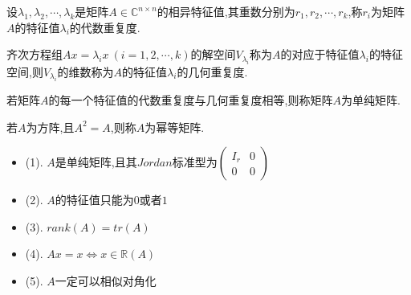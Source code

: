\begin{definition}[代数重复度]
	设$\lambda_{1},\lambda_{2},\cdots,\lambda_{k}$是矩阵$A\in \mathbb{C}^{n\times n}$的相异特征值,其重数分别为$r_{1},r_{2},\cdots,r_{k}$,称$r_{i}$为矩阵$A$的特征值$\lambda_{i}$的代数重复度.
\end{definition}
\begin{definition}[几何重复度]
	齐次方程组$Ax=\lambda_{i}x\ (i=1,2,\cdots,k)$的解空间$V_{\lambda_{i}}$称为$A$的对应于特征值$\lambda_{i}$的特征空间,则$V_{\lambda_{i}}$的维数称为$A$的特征值$\lambda_{i}$的几何重复度.
\end{definition}
\begin{definition}[单纯矩阵]
	若矩阵$A$的每一个特征值的代数重复度与几何重复度相等,则称矩阵$A$为单纯矩阵.
\end{definition}
\begin{definition}[幂等矩阵]
	若$A$为方阵,且$A^2=A$,则称$A$为幂等矩阵.
\end{definition}
\begin{property}[幂等矩阵$A$性质]
	\begin{itemize}
		\item (1). $A$是单纯矩阵,且其$Jordan$标准型为$\left(\begin{matrix}
			I_{r}&0\\0&0
		\end{matrix} \right) $
		\item (2). $A$的特征值只能为$0$或者$1$
		\item (3). $rank(A)=tr(A)$
		\item (4). $Ax=x\Leftrightarrow x\in\mathbb{R}(A)$
		\item (5). $A$一定可以相似对角化
	\end{itemize}
\end{property}
